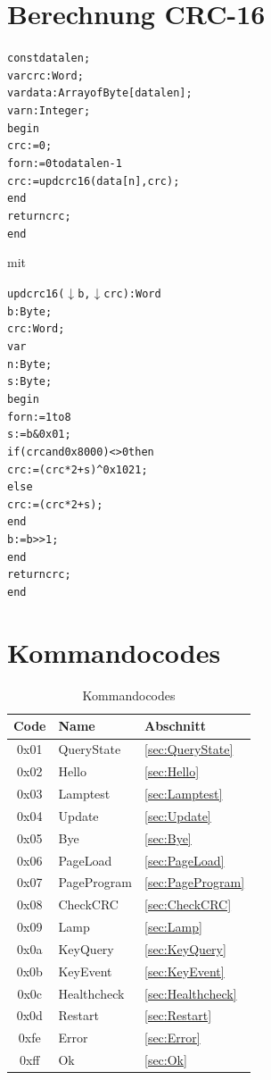 \documentclass[10pt,a4paper]{article}
\begin{document}
\section{Berechnung CRC-16}
\label{CRC16}
\begin{alltt}
const datalen;
var crc: Word;
var data: Array of Byte[datalen];
var n: Integer;
begin
  crc:= 0;
  for n:=0 to datalen-1
    crc := updcrc16(data[n],crc); 
  end
  return crc;
end
\end{alltt}
mit
\begin{alltt}
updcrc16(\(\downarrow\) b,\(\downarrow\) crc): Word
  b : Byte;
  crc: Word;
var
  n : Byte;
  s : Byte;
begin
  for n:=1 to 8
    s := b & 0x01;
    if (crc and 0x8000)<> 0 then
      crc := (crc * 2 + s) ^ 0x1021;
    else
      crc := (crc * 2 + s);
    end
    b := b >> 1;
  end
  return crc;
end
\end{alltt}

\section{Kommandocodes}
\begin{table}[H]
\centering
\begin{tabular}{c|l|l}
\textbf{Code} & \textbf{Name} & \textbf{Abschnitt} \\ \hline
0x01 & QueryState & \ref{sec:QueryState}\\
0x02 & Hello & \ref{sec:Hello}\\
0x03 & Lamptest & \ref{sec:Lamptest}\\
0x04 & Update & \ref{sec:Update}\\
0x05 & Bye & \ref{sec:Bye}\\
0x06 & PageLoad & \ref{sec:PageLoad}\\
0x07 & PageProgram & \ref{sec:PageProgram}\\
0x08 & CheckCRC & \ref{sec:CheckCRC}\\
0x09 & Lamp & \ref{sec:Lamp}\\
0x0a & KeyQuery & \ref{sec:KeyQuery}\\
0x0b & KeyEvent & \ref{sec:KeyEvent}\\
0x0c & Healthcheck & \ref{sec:Healthcheck}\\
0x0d & Restart & \ref{sec:Restart}\\
0xfe & Error & \ref{sec:Error}\\
0xff & Ok & \ref{sec:Ok}
\end{tabular}
\caption{Kommandocodes}
\end{table}



\nocite{*}

\printbibliography
\end{document}
